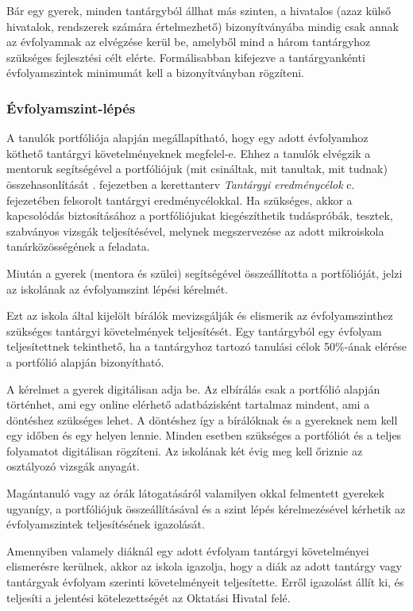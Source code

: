 Bár egy gyerek, minden tantárgyból állhat más szinten, a hivatalos (azaz külső
hivatalok, rendszerek számára értelmezhető) bizonyítványába mindig csak annak
az évfolyamnak
az elvégzése kerül be, amelyből mind a három tantárgyhoz szükséges fejlesztési
célt elérte.
Formálisabban kifejezve a tantárgyankénti évfolyamszintek minimumát kell a
bizonyítványban rögzíteni.

\subsubsection{Évfolyamszint-lépés}
\label{sec:evfolyamszintlepes}
A tanulók portfóliója alapján megállapítható, hogy egy adott évfolyamhoz
köthető tantárgyi követelményeknek megfelel-e.
Ehhez a tanulók elvégzik a mentoruk segítségével a portfóliójuk (mit csináltak,
mit tanultak, mit tudnak) összehasonlítását \ifkerettanterv
    .
    fejezetben
\else
    a kerettanterv \emph{Tantárgyi eredménycélok} c. fejezetében
\fi
felsorolt tantárgyi
eredménycélokkal.
Ha szükséges, akkor a kapcsolódás biztosításához a portfóliójukat
kiegészíthetik tudáspróbák, tesztek, szabványos vizsgák teljesítésével, melynek
megszervezése az adott mikroiskola tanárközösségének a feladata.

Miután a gyerek (mentora és szülei) segítségével összeállította a portfólióját,
jelzi az iskolának az évfolyamszint lépési kérelmét.

Ezt az iskola által kijelölt bírálók mevizsgálják és elismerik az
évfolyamszinthez szükséges tantárgyi követelmények teljesítését.
Egy tantárgyból egy évfolyam teljesítettnek tekinthető, ha a tantárgyhoz
tartozó tanulási célok 50\%-ának elérése a portfólió alapján bizonyítható.

A kérelmet a gyerek digitálisan adja be.
Az elbírálás csak a portfólió alapján történhet, ami egy
online elérhető adatbázisként tartalmaz mindent, ami a döntéshez szükséges
lehet. A döntéshez így a bírálóknak és a gyereknek nem
kell egy időben és egy helyen lennie. Minden esetben szükséges a portfóliót és
a teljes folyamatot digitálisan rögzíteni.
Az iskolának két évig meg kell őriznie az osztályozó vizsgák anyagát.

Magántanuló vagy az órák látogatásáról valamilyen okkal
felmentett gyerekek ugyanígy, a portfóliójuk összeállításával és a szint lépés
kérelmezésével kérhetik az évfolyamszintek teljesítésének igazolását.

Amennyiben valamely diáknál egy adott évfolyam tantárgyi követelményei
elismerésre kerülnek, akkor az iskola igazolja, hogy a diák az adott tantárgy
vagy tantárgyak évfolyam szerinti követelményeit teljesítette.
Erről igazolást állít ki, és teljesíti a jelentési kötelezettségét az Oktatási
Hivatal felé.

